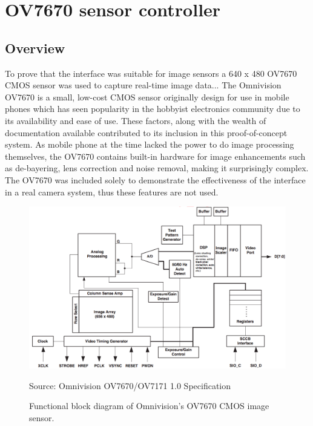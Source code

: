 \section{OV7670 sensor controller}
\subsection{Overview}
To prove that the interface was suitable for image sensors a 640 x 480 OV7670 CMOS sensor was used to capture real-time image data... The Omnivision OV7670 is a small, low-cost CMOS sensor originally design for use in mobile phones which has seen popularity in the hobbyist electronics community due to its availability and ease of use. These factors, along with the wealth of documentation available contributed to its inclusion in this proof-of-concept system. As mobile phone at the time lacked the power to do image processing themselves, the OV7670 contains built-in hardware for image enhancements such as de-bayering, lens correction and noise removal, making it surprisingly complex. The OV7670 was included solely to demonstrate the effectiveness of the interface in a real camera system, thus these features are not used.

\begin{figure}
  \centering
  \includegraphics[width=1\textwidth]{./img/ov7670_block_diagram.png}\par
Source: Omnivision OV7670/OV7171 1.0 Specification
  \caption{Functional block diagram of Omnivision's OV7670 CMOS image sensor.}
  \label{fig:ov7670_block_diagram}
\end{figure}

